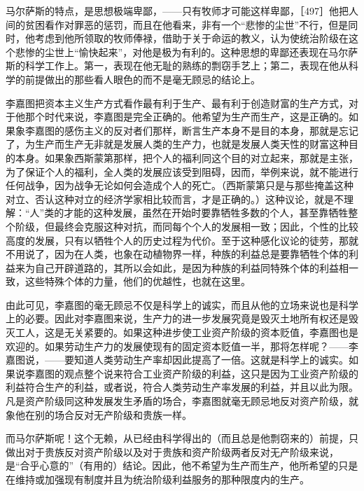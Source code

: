 马尔萨斯的特点，是思想极端卑鄙，——只有牧师才可能这样卑鄙，［497］他把人间的贫困看作对罪恶的惩罚，而且在他看来，非有一个“悲惨的尘世”不行，但是同时，他考虑到他所领取的牧师俸禄，借助于关于命运的教义，认为使统治阶级在这个悲惨的尘世上“愉快起来”，对他是极为有利的。这种思想的卑鄙还表现在马尔萨斯的科学工作上。第一，表现在他无耻的熟练的剽窃手艺上；第二，表现在他从科学的前提做出的那些看人眼色的而不是毫无顾忌的结论上。


李嘉图把资本主义生产方式看作最有利于生产、最有利于创造财富的生产方式，对于他那个时代来说，李嘉图是完全正确的。他希望为生产而生产，这是正确的。如果象李嘉图的感伤主义的反对者们那样，断言生产本身不是目的本身，那就是忘记了，为生产而生产无非就是发展人类的生产力，也就是发展人类天性的财富这种目的本身。如果象西斯蒙第那样，把个人的福利同这个目的对立起来，那就是主张，为了保证个人的福利，全人类的发展应该受到阻碍，因而，举例来说，就不能进行任何战争，因为战争无论如何会造成个人的死亡。（西斯蒙第只是与那些掩盖这种对立、否认这种对立的经济学家相比较而言，才是正确的。）这种议论，就是不理解：“人”类的才能的这种发展，虽然在开始时要靠牺牲多数的个人，甚至靠牺牲整个阶级，但最终会克服这种对抗，而同每个个人的发展相一致；因此，个性的比较高度的发展，只有以牺牲个人的历史过程为代价。至于这种感化议论的徒劳，那就不用说了，因为在人类，也象在动植物界一样，种族的利益总是要靠牺牲个体的利益来为自己开辟道路的，其所以会如此，是因为种族的利益同特殊个体的利益相一致，这些特殊个体的力量，他们的优越性，也就在这里。

由此可见，李嘉图的毫无顾忌不仅是科学上的诚实，而且从他的立场来说也是科学上的必要。因此对李嘉图来说，生产力的进一步发展究竟是毁灭土地所有权还是毁灭工人，这是无关紧要的。如果这种进步使工业资产阶级的资本贬值，李嘉图也是欢迎的。如果劳动生产力的发展使现有的固定资本贬值一半，那将怎样呢？——李嘉图说，——要知道人类劳动生产率却因此提高了一倍。这就是科学上的诚实。如果说李嘉图的观点整个说来符合工业资产阶级的利益，这只是因为工业资产阶级的利益符合生产的利益，或者说，符合人类劳动生产率发展的利益，并且以此为限。凡是资产阶级同这种发展发生矛盾的场合，李嘉图就毫无顾忌地反对资产阶级，就象他在别的场合反对无产阶级和贵族一样。

而马尔萨斯呢！这个无赖，从已经由科学得出的（而且总是他剽窃来的）前提，只做出对于贵族反对资产阶级以及对于贵族和资产阶级两者反对无产阶级来说，是“合乎心意的”（有用的）结论。因此，他不希望为生产而生产，他所希望的只是在维持或加强现有制度并且为统治阶级利益服务的那种限度内的生产。


